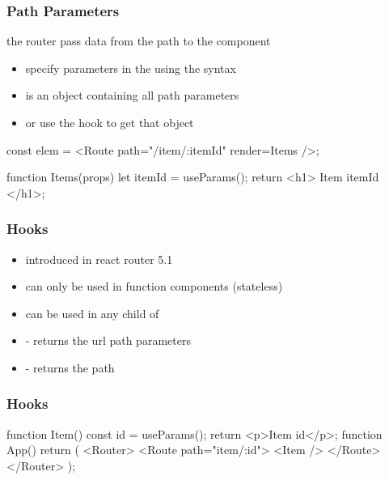 \begin{frame}[fragile] \frametitle{Path Parameters}
the router pass data from the path to the component
\begin{itemize}
  \item specify parameters in the  using the syntax
  \item {} is an object containing all path parameters
  \item or use the   hook to get that object
\end{itemize}

\vspace{5mm}
\begin{CodeBox}{}
const elem = <Route path="/item/:itemId" render={Items} />;

function Items(props) {
  let { itemId } = useParams();
  return <h1> Item {itemId} </h1>;
}
\end{CodeBox}
\end{frame}

\begin{frame}[fragile] \frametitle{Hooks}
\begin{itemize}
  \item introduced in react router 5.1
  \item can only be used in function components (stateless)
  \item can be used in any child of 
  \item {} - returns the url path parameters
  \item {} - returns the path
\end{itemize}
\end{frame}

\begin{frame}[fragile] \frametitle{Hooks}
\begin{CodeBox}{}
function Item() {
      const { id } = useParams();
      return <p>Item {id}</p>;
}
function App() {
  return (
      <Router>
        <Route path="item/:id">
          <Item />
        </Route>
      </Router>
  );
}
\end{CodeBox}
\end{frame}

